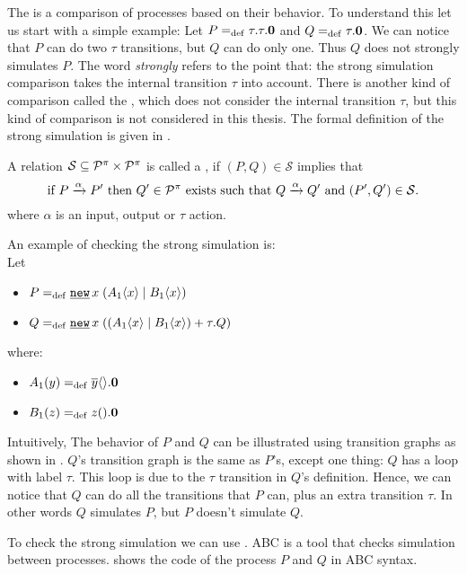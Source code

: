 The  is a comparison of processes based on their behavior. To understand this let us start with a simple example:
Let $P=_{\mathrm{def}}\tau.\tau.\mathbf{0}$ and $Q=_{\mathrm{def}}\tau.\mathbf{0}$. We can notice that $P$ can do two $\tau$ transitions, but $Q$ can do only one. Thus $Q$ does not strongly simulates $P$. The word \textit{strongly} refers to the point that: the strong simulation comparison takes the internal transition $\tau$ into account. There is another kind of comparison called the  , which does not consider the internal transition $\tau$, but this kind of comparison is not considered in this thesis. The formal definition of the strong simulation is given in .

\begin{definition}
\label{def_strong_sim}
A relation $\mathcal{S}\subseteq\mathcal P^{\pi}\times\mathcal P^{\pi}$ is called a , if $(P,Q)\in\mathcal{S}$ implies that
\[\text{if } P \xrightarrow{\alpha} P' \text{ then }Q'\in\mathcal P^{\pi} \text{ exists such that } Q \xrightarrow{\alpha} Q' \text{ and } (P',Q')\in\mathcal{S}.\]
where $\alpha$ is an input, output or $\tau$ action.
\end{definition}

An example of checking the strong simulation is:
\\Let
\begin{itemize}
\item $P\define\procres{x}{(\procpar{\proccall{A_1}{x}}{\proccall{B_1}{x}})}$ 
\item $Q\define\procres{x}{(\procchoice{(\procpar{\proccall{A_1}{x}}{\proccall{B_1}{x}})}{\tau.Q})}$
\end{itemize}
where:
\begin{itemize}
\item $A_1(y)=_{\mathrm{def}}{}\overline{y}\langle{}\rangle.\mathbf{0}$
\item $B_1(z)=_{\mathrm{def}}{}z({}).\mathbf{0}$
\end{itemize}

Intuitively, The behavior of $P$ and $Q$ can be illustrated using transition graphs as shown in . $Q$'s transition graph is the same as $P$'s, except one thing: $Q$ has a loop with label $\tau$. This loop is due to the $\tau$ transition in $Q$'s definition. Hence, we can notice that $Q$ can do all the transitions that $P$ can, plus an extra transition $\tau$. In other words $Q$ simulates $P$, but $P$ doesn't simulate $Q$.

To check the strong simulation we can use  \cite{abc}. ABC is a tool that checks simulation between  \picalc{} processes.  shows the code of the process $P$ and $Q$ in ABC syntax.
\raggedbottom


